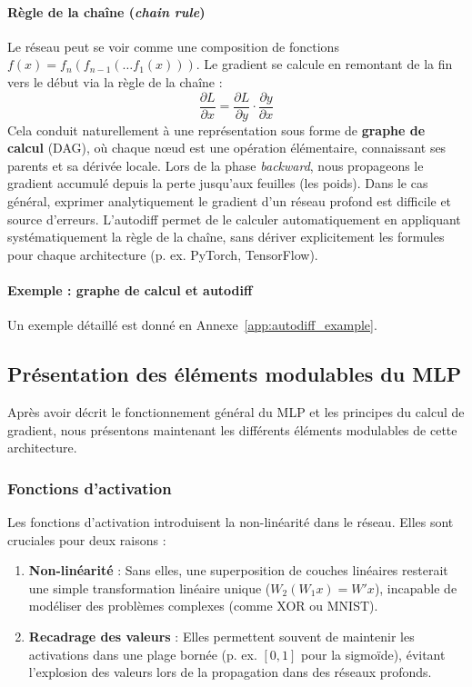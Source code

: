 \documentclass[a4paper,11pt]{article}
\begin{document}
\paragraph{Règle de la chaîne (\textit{chain rule})}
Le réseau peut se voir comme une composition de fonctions $f(x) = f_n(f_{n-1}(\dots f_1(x)))$. Le gradient se calcule en remontant de la fin vers le début via la règle de la chaîne :
\[ \frac{\partial L}{\partial x} = \frac{\partial L}{\partial y} \cdot \frac{\partial y}{\partial x} \]
Cela conduit naturellement à une représentation sous forme de \textbf{graphe de calcul} (DAG), où chaque nœud est une opération élémentaire, connaissant ses parents et sa dérivée locale. Lors de la phase \textit{backward}, nous propageons le gradient accumulé depuis la perte jusqu'aux feuilles (les poids). Dans le cas général, exprimer analytiquement le gradient d'un réseau profond est difficile et source d'erreurs. L'autodiff permet de le calculer automatiquement en appliquant systématiquement la règle de la chaîne, sans dériver explicitement les formules pour chaque architecture (p. ex. PyTorch, TensorFlow).

\paragraph{Exemple : graphe de calcul et autodiff}
Un exemple détaillé est donné en Annexe~\ref{app:autodiff_example}.

\subsection{Présentation des éléments modulables du MLP}

Après avoir décrit le fonctionnement général du MLP et les principes du calcul de gradient, nous présentons maintenant les différents éléments modulables de cette architecture.

\subsubsection{Fonctions d'activation}
Les fonctions d'activation introduisent la non-linéarité dans le réseau. Elles sont cruciales pour deux raisons :
\begin{enumerate}
    \item \textbf{Non-linéarité} : Sans elles, une superposition de couches linéaires resterait une simple transformation linéaire unique ($W_2(W_1 x) = W'x$), incapable de modéliser des problèmes complexes (comme XOR ou MNIST).
    \item \textbf{Recadrage des valeurs} : Elles permettent souvent de maintenir les activations dans une plage bornée (p. ex. $[0,1]$ pour la sigmoïde), évitant l'explosion des valeurs lors de la propagation dans des réseaux profonds.
\end{enumerate}
\end{document}
